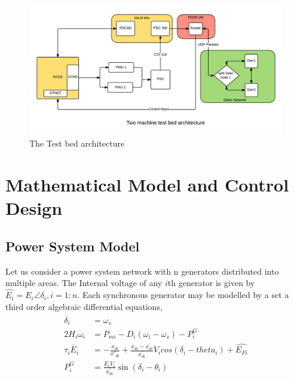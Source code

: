 \documentclass[a4paper]{article}
\begin{document}
\begin{figure}
\centering
\includegraphics[width=1\textwidth]{Test_bed_Architecture.png}
\caption{\label{fig:testbed}The Test bed architecture}
\end{figure}

\section{Mathematical Model and Control Design}
\subsection{Power System Model}
Let us consider a power system network with n generators distributed into multiple areas. The Internal voltage of any $i$th generator is given by $\hat{E_{i}} =E_{i}\angle\delta_{i}, i = 1:n$. Each synchronous generator may be modelled by a set a third order algebraic differential equations,
\begin{equation}
\label{eq1}
\begin{split}
\dot{\delta_{i}}&={\omega_{s}}\\
2H_{i}\dot{{\omega_{i}}} &= {P}_{mi}-D_{i}({\omega_{i}-\omega_{s}})-P_{i}^{G} \\
\tau_{i}\dot{E_{i}} &= -\frac{x_{di}}{x'_{di}}+ \frac{x_{di}-x^{'}_{di}}{x^{'}_{di}}V_{i}cos(\delta_{i}-theta_{i}) +\hat{E_{Fi}}\\
P_{i}^{G} &=\frac{{E}_{i}{V}_{i}}{{x}_{di}^{'}}{\sin}({\delta}_{i} -{\theta}_{i})\\
\end{split}
\end{equation}
\end{document}
